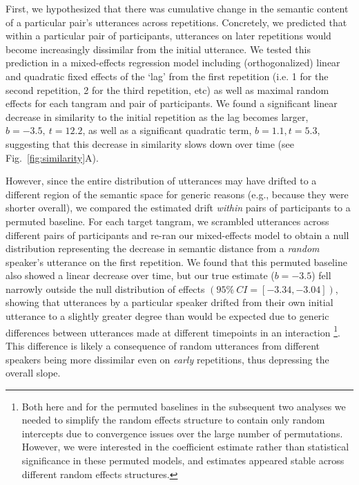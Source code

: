 \documentclass[alpha-refs]{wiley-article}
\begin{document}
First, we hypothesized that there was cumulative change in the semantic content of a particular pair's utterances across repetitions.
Concretely, we predicted that within a particular pair of participants, utterances on later repetitions would become increasingly dissimilar from the initial utterance.
We tested this prediction in a mixed-effects regression model including (orthogonalized) linear and quadratic fixed effects of the `lag' from the first repetition (i.e. 1 for the second repetition, 2 for the third repetition, etc) as well as maximal random effects for each tangram and pair of participants.
We found a significant linear decrease in similarity to the initial repetition as the lag becomes larger, $b = -3.5,~t = 12.2$, as well as a significant quadratic term, $b=1.1, t=5.3$, suggesting that this decrease in similarity slows down over time (see Fig.~\ref{fig:similarity}A).

However, since the entire distribution of utterances may have drifted to a different region of the semantic space for generic reasons (e.g., because they were shorter overall), we compared the estimated drift \emph{within} pairs of participants to a permuted baseline.
For each target tangram, we scrambled utterances across different pairs of participants and re-ran our mixed-effects model to obtain a null distribution representing the decrease in semantic distance from a \emph{random} speaker's utterance on the first repetition.
We found that this permuted baseline also showed a linear decrease over time, but our true estimate ($b=-3.5$) fell narrowly outside the null distribution of effects $(95\%~CI= [-3.34, -3.04])$, showing that utterances by a particular speaker drifted from their own initial utterance to a slightly greater degree than would be expected due to generic differences between utterances made at different timepoints in an interaction \footnote{Both here and for the permuted baselines in the subsequent two analyses we needed to simplify the random effects structure to contain only random intercepts due to convergence issues over the large number of permutations. However, we were interested in the coefficient estimate rather than statistical significance in these permuted models, and estimates appeared stable across different random effects structures.}.
This difference is likely a consequence of random utterances from different speakers being more dissimilar even on \emph{early} repetitions, thus depressing the overall slope.
\end{document}
